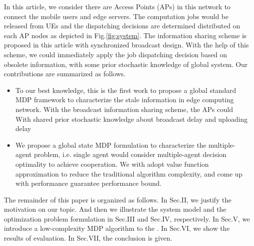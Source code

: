 In this article, we consider there are Access Points (APs) in this network to connect the mobile users and edge servers.
The computation jobs would be released from UEs and the dispatching decisions are determined distributed on each AP nodes as depicted in Fig.\ref{fig:system}.
The information sharing scheme is proposed in this article with synchronized broadcast design. With the help of this scheme, we could immediately apply the job dispatching decision based on obsolete information, with some prior stochastic knowledge of global system.
Our contributions are summarized as follows.
\begin{itemize}
    \item To our best knowledge, this is the first work to propose a global standard MDP framework to characterize the stale information in edge computing network.
    With the broadcast information sharing scheme, the APs could
    With shared prior stochastic knowledge about broadcast delay and uploading delay
    \item We propose a global state MDP formulation to characterize the multiple-agent problem, i.e. single agent would consider multiple-agent decision optimality to achieve cooperation.
    We with adopt value function approximation to reduce the traditional algorithm complexity, and come up with performance guarantee performance bound.
\end{itemize}


The remainder of this paper is organized as follows.
In Sec.II, we justify the motivation on our topic.
And then we illustrate the system model and the optimization problem formulation in Sec.III and Sec.IV, respectively.
In Sec.V, we introduce a low-complexity MDP algorithm to the .
In Sec.VI, we show the results of evaluation.
In Sec.VII, the conclusion is given.